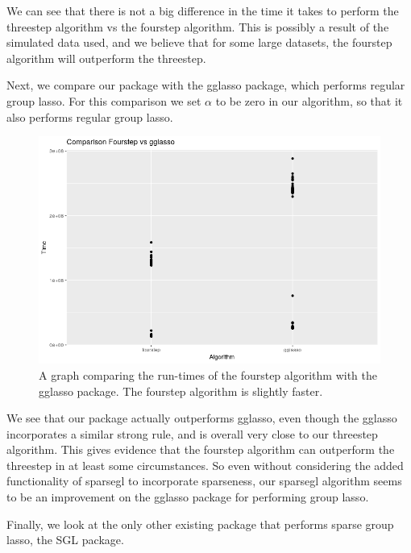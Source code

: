 \documentclass[12pt]{article}
\begin{document}
We can see that there is not a big difference in the time it takes to perform the threestep algorithm vs the fourstep algorithm. This is possibly a result of the simulated data used, and we believe that for some large datasets, the fourstep algorithm will outperform the threestep.

Next, we compare our package with the gglasso package, which performs regular group lasso. For this comparison we set $\alpha$ to be zero in our algorithm, so that it also performs regular group lasso. 

\begin{figure}[tb!]
\centering
\includegraphics[scale=0.5]{fourvsgglasso.png}
\caption{A graph comparing the run-times of the fourstep algorithm with the gglasso package. The fourstep algorithm is slightly faster.}
\label{fig:1fourvsgglasso}
\end{figure}

We see that our package actually outperforms gglasso, even though the gglasso incorporates a similar strong rule, and is overall very close to our threestep algorithm. This gives evidence that the fourstep algorithm can outperform the threestep in at least some circumstances. So even without considering the added functionality of sparsegl to incorporate sparseness, our sparsegl algorithm seems to be an improvement on the gglasso package for performing group lasso.

Finally, we look at the only other existing package that performs sparse group lasso, the SGL package.
\end{document}
